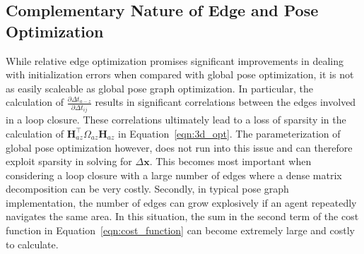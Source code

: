 %

\subsection{Complementary Nature of Edge and Pose Optimization}

While relative edge optimization promises significant improvements in dealing with initialization errors when compared with global pose optimization, it is not as easily scaleable as global pose graph optimization.  In particular, the calculation of $\frac {\partial\Delta t_{a-z}}{\partial\Delta t_{ij}}$ results in significant correlations between the edges involved in a loop closure.  These correlations ultimately lead to a loss of sparsity in the calculation of $\mathbf{H}_{az}^\top \Omega_{az} \mathbf{H}_{az}$ in Equation~\ref{eqn:3d_opt}.  The parameterization of global pose optimization however, does not run into this issue and can therefore exploit sparsity in solving for $\Delta \mathbf{x}$.  This becomes most important when considering a loop closure with a large number of edges where a dense matrix decomposition can be very costly. Secondly, in typical pose graph implementation, the number of edges can grow explosively if an agent repeatedly navigates the same area.  In this situation, the sum in the second term of the cost function in Equation~\ref{eqn:cost_function} can become extremely large and costly to calculate.

